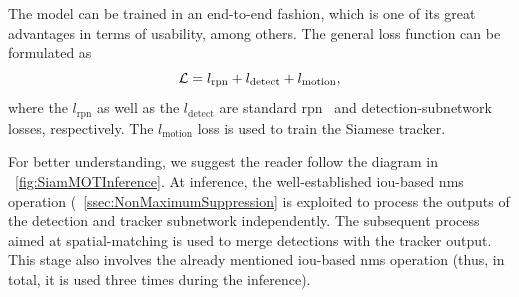 The \siammot{} model can be trained in an end-to-end fashion, which is one of its great advantages in terms of usability, among others. The general loss function can be formulated as
\begin{equation}
    \label{eq:SiamMOTGeneralLoss}
    \mathcal{L} = l_{\text{rpn}} + l_{\text{detect}} + l_{\text{motion}},
\end{equation}
where the $l_{\text{rpn}}$ as well as the $l_{\text{detect}}$ are standard \gls{rpn}~\cite{ren2017fasterrcnn} and detection-subnetwork~\cite{girshick2015fast} losses, respectively. The $l_{\text{motion}}$ loss is used to train the Siamese tracker.

For better understanding, we suggest the reader follow the diagram in \figstr{}~\ref{fig:SiamMOTInference}. At inference, the well-established \gls{iou}-based \gls{nms} operation (\sectionstr{}~\ref{ssec:NonMaximumSuppression} is exploited to process the outputs of the detection and tracker subnetwork independently. The subsequent process aimed at spatial-matching is used to merge detections with the tracker output. This stage also involves the already mentioned \gls{iou}-based \gls{nms} operation (thus, in total, it is used three times during the inference).

